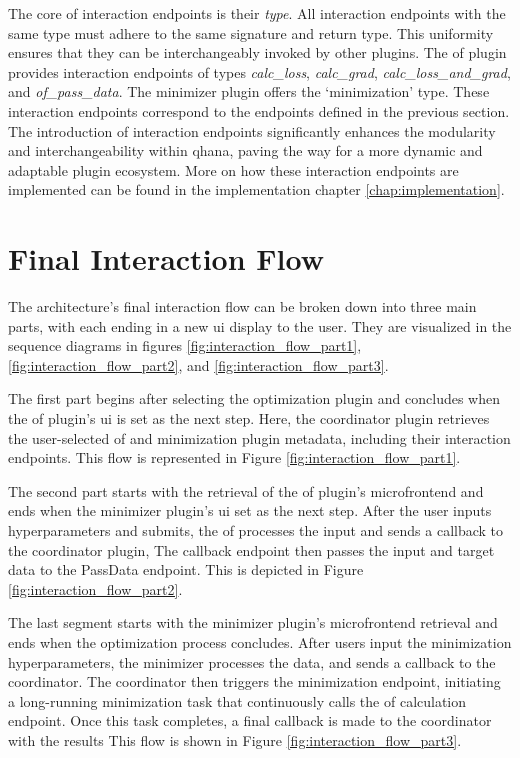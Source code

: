 \documentclass[
  a4paper,  %
  twoside,  %
  bibliography=totoc,
  headsepline,
  cleardoublepage=empty,
  parskip=half,
  draft=false
]{scrbook}
\begin{document}
The core of interaction endpoints is their \emph{type}.
All interaction endpoints with the same type must adhere to the same signature and return type.
This uniformity ensures that they can be interchangeably invoked by other plugins.
The \gls{of} plugin provides interaction endpoints of types \emph{calc\_loss}, \emph{calc\_grad}, \emph{calc\_loss\_and\_grad}, and \emph{of\_pass\_data}.
The minimizer plugin offers the `minimization' type.
These interaction endpoints correspond to the endpoints defined in the previous section.
The introduction of interaction endpoints significantly enhances the modularity and interchangeability within \gls{qhana}, paving the way for a more dynamic and adaptable plugin ecosystem.
More on how these interaction endpoints are implemented can be found in the implementation chapter \ref{chap:implementation}.

\section{Final Interaction Flow}
The architecture's final interaction flow can be broken down into three main parts, with each ending in a new \gls{ui} display to the user.
They are visualized in the sequence diagrams in figures \ref{fig:interaction_flow_part1}, \ref{fig:interaction_flow_part2}, and \ref{fig:interaction_flow_part3}.

The first part begins after selecting the optimization plugin and concludes when the \gls{of} plugin's \gls{ui} is set as the next step.
Here, the coordinator plugin retrieves the user-selected \gls{of} and minimization plugin metadata, including their interaction endpoints.
This flow is represented in Figure \ref{fig:interaction_flow_part1}.

The second part starts with the retrieval of the \gls{of} plugin's microfrontend and ends when the minimizer plugin's \gls{ui} set as the next step.
After the user inputs hyperparameters and submits, the \gls{of} processes the input and sends a callback to the coordinator plugin,
The callback endpoint then passes the input and target data to the PassData endpoint.
This is depicted in Figure \ref{fig:interaction_flow_part2}.

The last segment starts with the minimizer plugin's microfrontend retrieval and ends when the optimization process concludes.
After users input the minimization hyperparameters, the minimizer processes the data, and sends a callback to the coordinator.
The coordinator then triggers the minimization endpoint, initiating a long-running minimization task that continuously calls the \gls{of} calculation endpoint.
Once this task completes, a final callback is made to the coordinator with the results
This flow is shown in Figure \ref{fig:interaction_flow_part3}.
\end{document}
